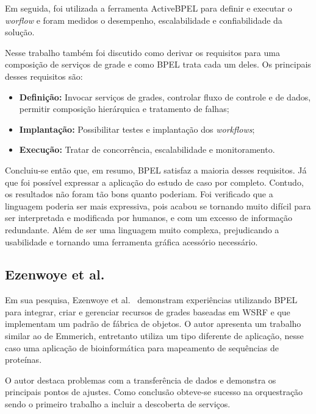 \documentclass[12pt]{report} %
\begin{document}
	    Em seguida, foi utilizada a ferramenta ActiveBPEL para definir e executar o \textit{worflow} e foram medidos o desempenho, escalabilidade e confiabilidade da solução.

	    Nesse trabalho também foi discutido como derivar os requisitos para uma composição de serviços de grade e como BPEL trata cada um deles.
	    Os principais desses requisitos são:
	    \begin{itemize}
	    \item \textbf{Definição:} Invocar serviços de grades, controlar fluxo de controle e de dados, permitir composição hierárquica e tratamento de falhas;
	    \item \textbf{Implantação:} Possibilitar testes e implantação dos \textit{workflows};
	    \item \textbf{Execução:} Tratar de concorrência, escalabilidade e monitoramento.
	    \end{itemize}

	    Concluiu-se então que, em resumo, BPEL satisfaz a maioria desses requisitos.
	    Já que foi possível expressar a aplicação do estudo de caso por completo.
	    Contudo, os resultados não foram tão bons quanto poderiam.
	    Foi verificado que a linguagem poderia ser mais expressiva, pois acabou se tornando muito difícil para ser interpretada e modificada por humanos, e com um excesso de informação redundante.
	    Além de ser uma linguagem muito complexa, prejudicando a usabilidade e tornando uma ferramenta gráfica acessório necessário.
		

	\subsection{Ezenwoye et al.}
	    Em sua pesquisa, Ezenwoye et al.~\cite{GridServiceComposition08} demonstram experiências utilizando BPEL para integrar, criar e gerenciar recursos de grades baseadas em WSRF e que implementam um padrão de fábrica de objetos.
	    O autor apresenta um trabalho similar ao de Emmerich, entretanto utiliza um tipo diferente de aplicação, nesse caso uma aplicação de bioinformática para mapeamento de sequências de proteínas.
	    
	    O autor destaca problemas com a transferência de dados e demonstra os principais pontos de ajustes.
	    Como conclusão obteve-se sucesso na orquestração sendo o primeiro trabalho a incluir a descoberta de serviços.
\end{document}
